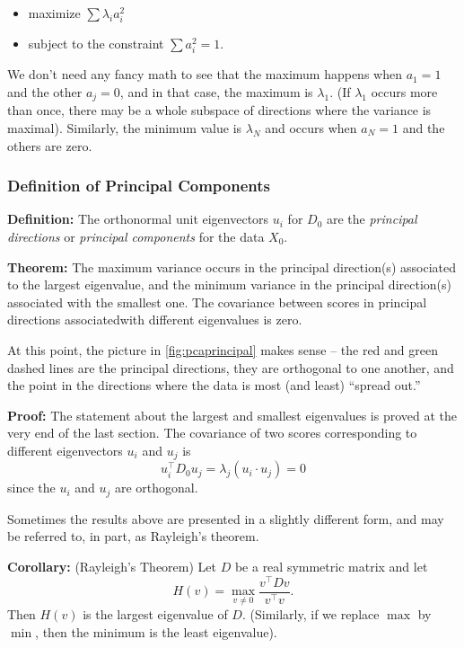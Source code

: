 \documentclass[
]{article}
\providecommand{\tightlist}{%
  \setlength{\itemsep}{0pt}\setlength{\parskip}{0pt}}
\begin{document}
\begin{itemize}
\tightlist
\item
  maximize \(\sum \lambda_{i}a_{i}^2\)
\item
  subject to the constraint \(\sum a_{i}^2 = 1\).
\end{itemize}

We don't need any fancy math to see that the maximum happens when
\(a_{1}=1\) and the other \(a_{j}=0\), and in that case, the maximum is
\(\lambda_{1}\). (If \(\lambda_{1}\) occurs more than once, there may be
a whole subspace of directions where the variance is maximal).
Similarly, the minimum value is \(\lambda_{N}\) and occurs when
\(a_{N}=1\) and the others are zero.

\hypertarget{definition-of-principal-components}{%
\subsubsection{Definition of Principal
Components}\label{definition-of-principal-components}}

\textbf{Definition:} The orthonormal unit eigenvectors \(u_{i}\) for
\(D_{0}\) are the \emph{principal directions} or \emph{principal
components} for the data \(X_{0}\).

\textbf{Theorem:} The maximum variance occurs in the principal
direction(s) associated to the largest eigenvalue, and the minimum
variance in the principal direction(s) associated with the smallest one.
The covariance between scores in principal directions associatedwith
different eigenvalues is zero.

At this point, the picture in \cref{fig:pcaprincipal} makes sense -- the
red and green dashed lines are the principal directions, they are
orthogonal to one another, and the point in the directions where the
data is most (and least) ``spread out.''

\textbf{Proof:} The statement about the largest and smallest eigenvalues
is proved at the very end of the last section. The covariance of two
scores corresponding to different eigenvectors \(u_{i}\) and \(u_{j}\)
is \[u_{i}^{\intercal}D_{0}u_{j} = \lambda_{j}(u_{i}\cdot u_{j}) = 0\]
since the \(u_{i}\) and \(u_{j}\) are orthogonal.

Sometimes the results above are presented in a slightly different form,
and may be referred to, in part, as Rayleigh's theorem.

\textbf{Corollary:} (Rayleigh's Theorem) Let \(D\) be a real symmetric
matrix and let \[
H(v) = \max_{v\not = 0}\frac{v^{\intercal}Dv}{v^{\intercal}v}.
\] Then \(H(v)\) is the largest eigenvalue of \(D\). (Similarly, if we
replace \(\max\) by \(\min\), then the minimum is the least eigenvalue).
\end{document}
